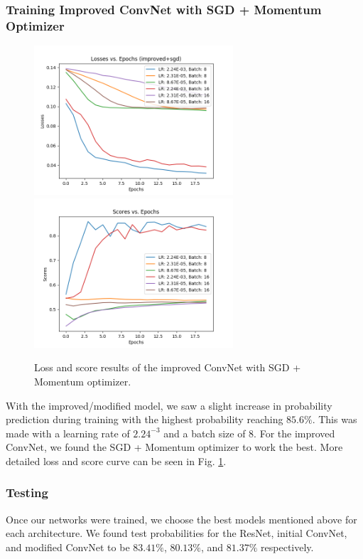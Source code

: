 \documentclass[11pt]{ieeeconf}
\begin{document}
\subsubsection{Training Improved ConvNet with SGD + Momentum Optimizer}
\begin{figure}[h]
  \centering
  \includegraphics[width=20em]{improved_sgd_Losses_20e.png}
  \includegraphics[width=20em]{improved_sgd_Scores_20e.png}
  \caption{Loss and score results of the improved ConvNet with SGD + Momentum optimizer.}
  \label{fig:improved}
\end{figure}

With the improved/modified model, we saw a slight increase in probability prediction during training with the highest probability reaching $85.6\%$. This was made with a learning rate of $2.24^{-3}$ and a batch size of $8$. For the improved ConvNet, we found the SGD + Momentum optimizer to work the best. More detailed loss and score curve can be seen in Fig. \ref{fig:improved}.

\subsubsection{Testing}
Once our networks were trained, we choose the best models mentioned above for each architecture. We found test probabilities for the ResNet, initial ConvNet, and modified ConvNet to be $83.41\%$, $80.13\%$, and $81.37\%$ respectively.
\end{document}
